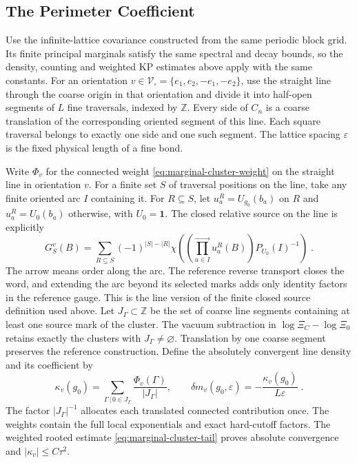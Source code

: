 \documentclass[11pt]{article}
\newcommand{\id}{\mathbf 1}
\begin{document}
\subsection{The Perimeter Coefficient}

Use the infinite-lattice covariance constructed from the same periodic block grid. Its finite principal marginals satisfy the same spectral and decay bounds, so the density, counting and weighted KP estimates above apply with the same constants. For an orientation $v\in \mathscr V_\square=\{e_1,e_2,-e_1,-e_2\}$, use the straight line through the coarse origin in that orientation and divide it into half-open segments of $L$ fine traversals, indexed by $\mathbb Z$. Every side of $C_n$ is a coarse translation of the corresponding oriented segment of this line. Each square traversal belongs to exactly one side and one such segment. The lattice spacing $\varepsilon$ is the fixed physical length of a fine bond.

Write $\Phi_v$ for the connected weight \eqref{eq:marginal-cluster-weight} on the straight line in orientation $v$.
For a finite set $S$ of traversal positions on the line, take any finite oriented arc $I$ containing it. For $R\subseteq S$, let $u_a^R=U_{g_0}(b_a)$ on $R$ and $u_a^R=U_0(b_a)$ otherwise, with $U_0=\id$. The closed relative source on the line is explicitly
\begin{equation}\label{eq:marginal-line-source}
    G_S^v(B)=\sum_{R\subseteq S}(-1)^{|S|-|R|}
        \chi\left(\left(\prod_{a\in I}^{\longrightarrow}u_a^R(B)\right)
            P_{U_0}(I)^{-1}\right)\;.
\end{equation}
The arrow means order along the arc. The reference reverse transport closes the word, and extending the arc beyond its selected marks adds only identity factors in the reference gauge. This is the line version of the finite closed source definition used above. Let $J_\Gamma\subset \mathbb Z$ be the set of coarse line segments containing at least one source mark of the cluster. The vacuum subtraction in $\log\Xi_C-\log\Xi_0$ retains exactly the clusters with $J_\Gamma\ne \varnothing$. Translation by one coarse segment preserves the reference construction. Define the absolutely convergent line density and its coefficient by
\begin{equation}\label{eq:marginal-full-perimeter}
    \boxed{\displaystyle
        \kappa_v(g_0)=\sum_{\Gamma\, | \,0\in J_\Gamma}
                    \frac{\Phi_v(\Gamma)}{|J_\Gamma|},
        \qquad \delta m_v(g_0,\varepsilon)
            =-\frac{\kappa_v(g_0)}{L\varepsilon}}
        \;.
\end{equation}
The factor $|J_\Gamma|^{-1}$ allocates each translated connected contribution once. The weights contain the full local exponentials and exact hard-cutoff factors. The weighted rooted estimate \eqref{eq:marginal-cluster-tail} proves absolute convergence and $|\kappa_v|\leq C\tau^2$.
\end{document}
